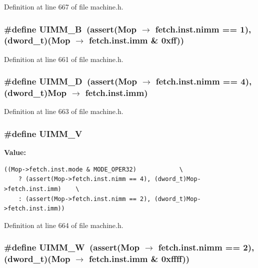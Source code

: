 Definition at line 667 of file machine.h.
\subsubsection[{UIMM\_\-B}]{\setlength{\rightskip}{0pt plus 5cm}\#define UIMM\_\-B~(assert(Mop $\rightarrow$ fetch.inst.nimm == 1), ({\bf dword\_\-t})(Mop $\rightarrow$ fetch.inst.imm \& 0xff))}\label{machine_8h_a9f2b699b7fd91bb636f1f5e7ba32ab1}




Definition at line 661 of file machine.h.
\subsubsection[{UIMM\_\-D}]{\setlength{\rightskip}{0pt plus 5cm}\#define UIMM\_\-D~(assert(Mop $\rightarrow$ fetch.inst.nimm == 4), ({\bf dword\_\-t})Mop $\rightarrow$ fetch.inst.imm)}\label{machine_8h_0acefcd68d490f68a927f394d2e6bfa0}




Definition at line 663 of file machine.h.
\subsubsection[{UIMM\_\-V}]{\setlength{\rightskip}{0pt plus 5cm}\#define UIMM\_\-V}\label{machine_8h_12c1a3248b81e8d81d5bab1483185a98}


\textbf{Value:}

\begin{Code}\begin{verbatim}((Mop->fetch.inst.mode & MODE_OPER32)            \
    ? (assert(Mop->fetch.inst.nimm == 4), (dword_t)Mop->fetch.inst.imm)    \
    : (assert(Mop->fetch.inst.nimm == 2), (dword_t)Mop->fetch.inst.imm))
\end{verbatim}
\end{Code}


Definition at line 664 of file machine.h.
\subsubsection[{UIMM\_\-W}]{\setlength{\rightskip}{0pt plus 5cm}\#define UIMM\_\-W~(assert(Mop $\rightarrow$ fetch.inst.nimm == 2), ({\bf dword\_\-t})(Mop $\rightarrow$ fetch.inst.imm \& 0xffff))}\label{machine_8h_59a05a787c5390c8be9ac9efedb94654}




